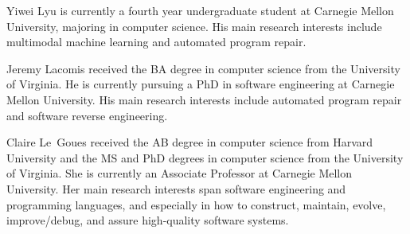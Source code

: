\documentclass[10pt,journal,compsoc]{IEEEtran}
\begin{document}
\begin{IEEEbiography}{Yiwei Lyu}
    is currently a fourth year undergraduate student at Carnegie Mellon University, majoring in computer science.
    His main research interests include multimodal machine learning and automated program repair.
\end{IEEEbiography}


\begin{IEEEbiography}{Jeremy Lacomis}
received the BA degree in computer science from the University of Virginia. He
is currently pursuing a PhD in software engineering at Carnegie Mellon
University. His main research interests include automated program repair and
software reverse engineering.
\end{IEEEbiography}

\begin{IEEEbiography}{Claire Le~Goues}
received the AB degree in computer science from Harvard University and the MS
and PhD degrees in computer science from the University of Virginia. She is
currently an Associate Professor at Carnegie Mellon University. Her main
research interests span software engineering and programming languages, and
especially in how to construct, maintain, evolve, improve/debug, and assure
high-quality software systems.
\end{IEEEbiography}






\end{document}
